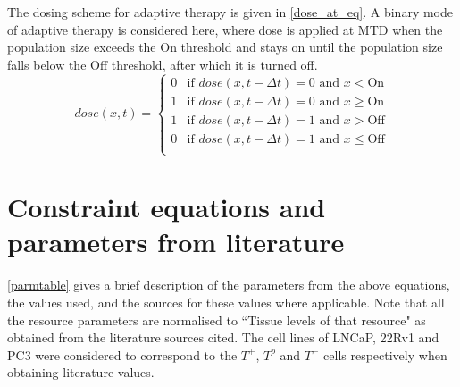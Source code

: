 The dosing scheme for adaptive therapy is given in \autoref{dose_at_eq}. A binary mode of adaptive therapy is considered here, where dose is applied at MTD when the population size exceeds the On threshold and stays on until the population size falls below the Off threshold, after which it is turned off.
\begin{equation}
  dose(x,t) = \begin{cases}
  0 &\text{if } dose(x,t-\Delta t) = 0 \text{ and } x < \text{On} \\
  1 &\text{if } dose(x,t-\Delta t) = 0 \text{ and } x \geq \text{On} \\
  1 &\text{if } dose(x,t-\Delta t) = 1 \text{ and } x > \text{Off} \\
  0 &\text{if } dose(x,t-\Delta t) = 1 \text{ and } x \leq \text{Off} \\
  \end{cases}
  \label{dose_at_eq}
\end{equation}

\section{Constraint equations and parameters from literature}
\autoref{parmtable} gives a brief description of the parameters from the above equations, the values used, and the sources for these values where applicable. Note that all the resource parameters are normalised to ``Tissue levels of that resource" as obtained from the literature sources cited. The cell lines of LNCaP, 22Rv1 and PC3 were considered to correspond to the $T^+$, $T^p$ and $T^-$ cells respectively when obtaining literature values.

